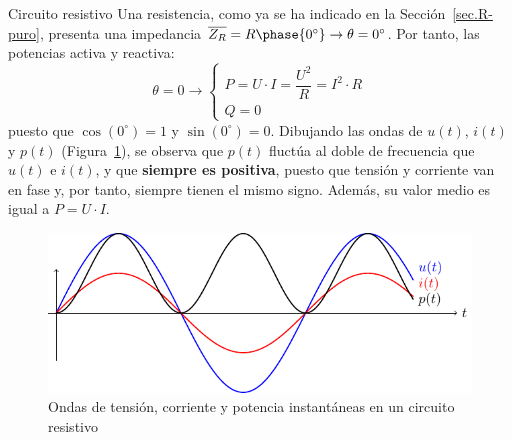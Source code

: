 \documentclass[11pt]{book} %
\makeatletter
\numberwithin{dummy}{section}
\theoremstyle{ocrenumbox}
\theoremstyle{blacknumex}
\theoremstyle{blacknumbox}
\theoremstyle{ocrenum}
\renewcommand{\subsection}{\@startsection {subsection}{2}{\z@}
{-3ex \@plus -0.1ex \@minus -.4ex}
{0.5ex \@plus.2ex }
{\normalfont\sffamily\bfseries}}
\makeatother
\begin{document}
	\subsection{Circuito resistivo}\label{sec.potencia_R}
	Una resistencia, como ya se ha indicado en la Sección~\ref{sec.R-puro}, presenta una impedancia $\overline{Z_R}=R\phase{0^\circ}\rightarrow \theta=0^\circ$. Por tanto, las potencias activa y reactiva: 
	\begin{equation}
		\theta = 0 \rightarrow
		\boxed{\begin{cases}
				P = U\cdot I = \dfrac{U^2}{R} = I^2\cdot R\\
				Q = 0
		\end{cases}}
	\end{equation}
	puesto que $\cos(0^\circ)=1$ y $\sin(0^\circ)=0$. Dibujando las ondas de $u(t)$, $i(t)$ y $p(t)$ (Figura~\ref{fig.resistivoPotencia}), se observa que $p(t)$ fluctúa al doble de frecuencia que $u(t)$ e $i(t)$, y que \textbf{siempre es positiva}, puesto que tensión y corriente van en fase y, por tanto, siempre tienen el mismo signo. Además, su valor medio es igual a $P=U\cdot I$.
	\begin{figure}[htbp]
		\centering
		\includegraphics{../figs/resistivoPotencia.pdf}
		\caption{Ondas de tensión, corriente y potencia instantáneas en un circuito resistivo}
		\label{fig.resistivoPotencia}
	\end{figure}
	
\end{document}
